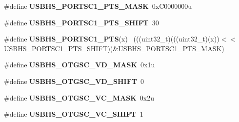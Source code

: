 \begin{DoxyCompactItemize}
\item 
\hypertarget{group___u_s_b_h_s___register___masks_gae9c08b3e7deea8c86ec4e1837b5d6de6}{}\#define {\bfseries U\+S\+B\+H\+S\+\_\+\+P\+O\+R\+T\+S\+C1\+\_\+\+P\+T\+S\+\_\+\+M\+A\+S\+K}~0x\+C0000000u\label{group___u_s_b_h_s___register___masks_gae9c08b3e7deea8c86ec4e1837b5d6de6}

\item 
\hypertarget{group___u_s_b_h_s___register___masks_gaa8ba4a77705f98312afaa2e5c9722249}{}\#define {\bfseries U\+S\+B\+H\+S\+\_\+\+P\+O\+R\+T\+S\+C1\+\_\+\+P\+T\+S\+\_\+\+S\+H\+I\+F\+T}~30\label{group___u_s_b_h_s___register___masks_gaa8ba4a77705f98312afaa2e5c9722249}

\item 
\hypertarget{group___u_s_b_h_s___register___masks_gaebacd7544dc24981aa9303702fb3e193}{}\#define {\bfseries U\+S\+B\+H\+S\+\_\+\+P\+O\+R\+T\+S\+C1\+\_\+\+P\+T\+S}(x)                                      ~(((uint32\+\_\+t)(((uint32\+\_\+t)(x))$<$$<$U\+S\+B\+H\+S\+\_\+\+P\+O\+R\+T\+S\+C1\+\_\+\+P\+T\+S\+\_\+\+S\+H\+I\+F\+T))\&U\+S\+B\+H\+S\+\_\+\+P\+O\+R\+T\+S\+C1\+\_\+\+P\+T\+S\+\_\+\+M\+A\+S\+K)\label{group___u_s_b_h_s___register___masks_gaebacd7544dc24981aa9303702fb3e193}

\item 
\hypertarget{group___u_s_b_h_s___register___masks_gae2e7dce76cdf4913739cd78a945d065b}{}\#define {\bfseries U\+S\+B\+H\+S\+\_\+\+O\+T\+G\+S\+C\+\_\+\+V\+D\+\_\+\+M\+A\+S\+K}~0x1u\label{group___u_s_b_h_s___register___masks_gae2e7dce76cdf4913739cd78a945d065b}

\item 
\hypertarget{group___u_s_b_h_s___register___masks_ga1ed618268664587007278e6a2253c446}{}\#define {\bfseries U\+S\+B\+H\+S\+\_\+\+O\+T\+G\+S\+C\+\_\+\+V\+D\+\_\+\+S\+H\+I\+F\+T}~0\label{group___u_s_b_h_s___register___masks_ga1ed618268664587007278e6a2253c446}

\item 
\hypertarget{group___u_s_b_h_s___register___masks_ga00366e2227cd8aa3209e70299278f795}{}\#define {\bfseries U\+S\+B\+H\+S\+\_\+\+O\+T\+G\+S\+C\+\_\+\+V\+C\+\_\+\+M\+A\+S\+K}~0x2u\label{group___u_s_b_h_s___register___masks_ga00366e2227cd8aa3209e70299278f795}

\item 
\hypertarget{group___u_s_b_h_s___register___masks_ga3ac711997a68a80c62ecc5f43d067797}{}\#define {\bfseries U\+S\+B\+H\+S\+\_\+\+O\+T\+G\+S\+C\+\_\+\+V\+C\+\_\+\+S\+H\+I\+F\+T}~1\label{group___u_s_b_h_s___register___masks_ga3ac711997a68a80c62ecc5f43d067797}


\end{DoxyCompactItemize}
